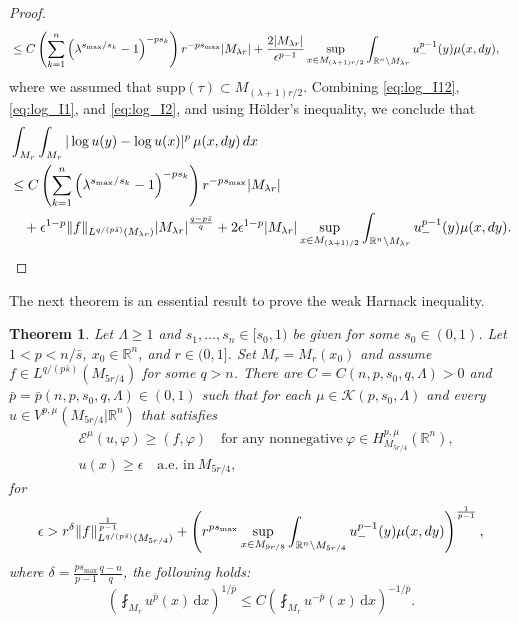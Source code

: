 \documentclass[11pt]{amsart}
\theoremstyle{plain}
\newtheorem{theorem}{Theorem}[section]
\theoremstyle{definition}
\numberwithin{equation}{section}
\renewcommand{\d}{\textnormal{d}}
\newcommand{\R}{\mathbb{R}}
\begin{document}
\begin{proof}
\begin{equation}
\begin{split}
&\leq C \left( \sum_{k=1}^n \left( \lambda^{s_{\max}/s_k}-1 \right)^{-ps_k} \right)r^{-ps_{\max}} |M_{\lambda r}| + \frac{2|M_{\lambda r}|}{\epsilon^{p-1}} \sup_{x \in M_{(\lambda+1)r/2}} \int_{\mathbb{R}^n \setminus M_{\lambda r}} u_-^{p-1}(y) \mu(x, \d y),
\end{split}
\end{equation}
where we assumed that $\mathrm{supp}(\tau) \subset M_{(\lambda+1)r/2}$. Combining \eqref{eq:log_I12}, \eqref{eq:log_I1}, and \eqref{eq:log_I2}, and using H\"older's inequality, we conclude that
\begin{equation*}
\begin{split}
&\int_{M_r} \int_{M_r} |\log u(y) - \log u(x)|^p \,\mu(x,\d y) \,\d x \\
&\leq C \left( \sum_{k=1}^n \left( \lambda^{s_{\max}/s_k}-1 \right)^{-ps_k} \right) r^{-ps_{\max}} |M_{\lambda r}| \\
&\quad + \epsilon^{1-p} \|f\|_{L^{q/(p\bar{s})}(M_{\lambda r})} |M_{\lambda r}|^{\frac{q-p\bar{s}}{q}} + 2\epsilon^{1-p} |M_{\lambda r}| \sup_{x \in M_{(\lambda+1)/2}} \int_{\mathbb{R}^n \setminus M_{\lambda r}} u_-^{p-1}(y) \mu(x, \d y).
\end{split}
\end{equation*}
\end{proof}

The next theorem is an essential result to prove the weak Harnack inequality.

\begin{theorem}\label{thm:flipsigns}
Let $\Lambda \ge 1$ and $s_1,\dots,s_n\in[s_0,1)$ be given for some $s_0\in(0,1)$. Let $1<p<  n/\bar{s}$, $x_0 \in \R^n$, and $r \in (0,1]$. Set $M_r = M_r(x_0)$ and assume $f \in L^{q/(p\bar{s})}(M_{5r/4})$ for some $q > n$. There are $C=C(n,p,s_0,q,\Lambda)>0$ and $\bar{p}=\bar{p}(n,p,s_0,q,\Lambda) \in (0, 1)$ such that for each $\mu \in \mathcal{K}(p, s_0, \Lambda)$ and every $u \in V^{p,\mu}(M_{5r/4} | \mathbb{R}^n)$ that satisfies
\begin{align*}
&\mathcal{E}^\mu(u, \varphi) \geq (f, \varphi) \quad \text{for any nonnegative}~ \varphi \in H^{p,\mu}_{M_{5r/4}}(\R^n), \\
&u(x) \geq \epsilon \quad \text{a.e. in}~ M_{5r/4},
\end{align*}
for
\begin{equation*}
\epsilon > r^{\delta}\|f\|_{L^{q/(p\bar{s})}(M_{5r/4})}^{\frac{1}{p-1}} + \left( r^{ps_{\max}} \sup_{x \in M_{9r/8}} \int_{\mathbb{R}^n \setminus M_{5r/4}} u_-^{p-1}(y) \mu(x, \d y) \right)^{\frac{1}{p-1}},
\end{equation*}
where $\delta = \frac{ps_{\max}}{p-1} \frac{q-n}{q}$, the following holds:
\begin{equation*}
\left( \fint_{M_r} u^{\bar{p}}(x) \,\mathrm{d}x \right)^{1/\bar{p}} \leq C \left( \fint_{M_r} u^{-\bar{p}}(x) \,\mathrm{d}x \right)^{-1/\bar{p}}.
\end{equation*}
\end{theorem}
\end{document}
